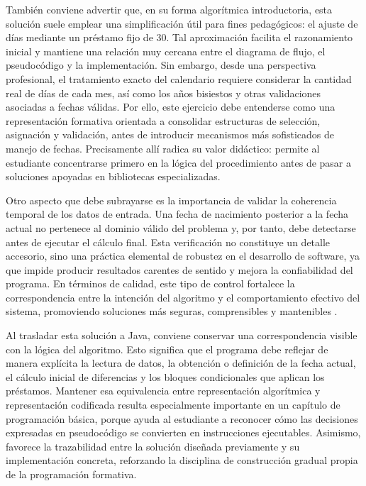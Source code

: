\documentclass[12pt,twoside]{book}
\begin{document}
					También conviene advertir que, en su forma algorítmica introductoria, esta solución suele emplear una simplificación útil para fines pedagógicos: el ajuste de días mediante un préstamo fijo de 30. Tal aproximación facilita el razonamiento inicial y mantiene una relación muy cercana entre el diagrama de flujo, el pseudocódigo y la implementación. Sin embargo, desde una perspectiva profesional, el tratamiento exacto del calendario requiere considerar la cantidad real de días de cada mes, así como los años bisiestos y otras validaciones asociadas a fechas válidas. Por ello, este ejercicio debe entenderse como una representación formativa orientada a consolidar estructuras de selección, asignación y validación, antes de introducir mecanismos más sofisticados de manejo de fechas. Precisamente allí radica su valor didáctico: permite al estudiante concentrarse primero en la lógica del procedimiento antes de pasar a soluciones apoyadas en bibliotecas especializadas.
					
					Otro aspecto que debe subrayarse es la importancia de validar la coherencia temporal de los datos de entrada. Una fecha de nacimiento posterior a la fecha actual no pertenece al dominio válido del problema y, por tanto, debe detectarse antes de ejecutar el cálculo final. Esta verificación no constituye un detalle accesorio, sino una práctica elemental de robustez en el desarrollo de software, ya que impide producir resultados carentes de sentido y mejora la confiabilidad del programa. En términos de calidad, este tipo de control fortalece la correspondencia entre la intención del algoritmo y el comportamiento efectivo del sistema, promoviendo soluciones más seguras, comprensibles y mantenibles \cite{Pressman2019Software,Sommerville2015Software}.
					
					Al trasladar esta solución a Java, conviene conservar una correspondencia visible con la lógica del algoritmo. Esto significa que el programa debe reflejar de manera explícita la lectura de datos, la obtención o definición de la fecha actual, el cálculo inicial de diferencias y los bloques condicionales que aplican los préstamos. Mantener esa equivalencia entre representación algorítmica y representación codificada resulta especialmente importante en un capítulo de programación básica, porque ayuda al estudiante a reconocer cómo las decisiones expresadas en pseudocódigo se convierten en instrucciones ejecutables. Asimismo, favorece la trazabilidad entre la solución diseñada previamente y su implementación concreta, reforzando la disciplina de construcción gradual propia de la programación formativa.
					
\end{document}
